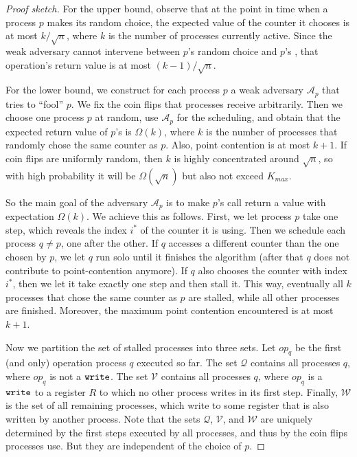 \documentclass[11pt,letterpaper]{article}
\newcommand{\xwrite}{\text{\tt write}\xspace}
\renewcommand{\AA}{\mathcal{A}}
\newcommand{\QQ}{\mathcal{Q}}
\newcommand{\VV}{\mathcal{V}}
\newcommand{\WW}{\mathcal{W}}
\newcommand{\op}{\ensuremath{\mathit{op}}}
\begin{document}
\begin{proof}[Proof sketch]
For the upper bound, observe that at the point in time when a process $p$ makes its random choice, the expected value of the counter it chooses is at most $k/\sqrt{n}$, where $k$ is the number of processes currently active.
Since the weak adversary cannot intervene between $p$'s random choice and $p$'s \FAI{}, that operation's return value is at most $(k-1)/\sqrt{n}$.

For the lower bound, we construct for each process $p$ a weak adversary $\AA_p$ that tries to ``fool'' $p$.
We fix the coin flips that processes receive arbitrarily.
Then we choose one process $p$ at random, use $\AA_p$ for the scheduling, and obtain that the expected return value of $p$'s \FAI{} is $\Omega(k)$, where $k$ is the number of processes that randomly chose the same counter as $p$.
Also, point contention is at most $k+1$.
If coin flips are uniformly random, then $k$ is highly concentrated around $\sqrt{n}$, so with high probability it will be $\Omega(\sqrt{n})$ but also not exceed $K_{max}$.

So the main goal of the adversary $\AA_p$ is to make $p$'s \FAI{} call return a value with expectation $\Omega(k)$.
We achieve this as follows.
First, we let process $p$ take one step, which reveals the index $i^\ast$ of the counter it is using.
Then we schedule each process $q\neq p$, one after the other.
If $q$ accesses a different counter than the one chosen by $p$, we let $q$ run solo until it finishes the algorithm (after that $q$ does not contribute to point-contention anymore).
If $q$ also chooses the counter with index $i^\ast$, then we let it take exactly one step and then stall it.
This way, eventually all $k$ processes that chose the same counter as $p$ are stalled, while all other processes are finished.
Moreover, the maximum point contention encountered is at most $k+1$.

Now we partition the set of stalled processes into three sets.
Let $\op_q$ be the first (and only) operation process $q$ executed so far.
The set $\QQ$ contains all processes $q$, where $\op_q$ is not a $\xwrite$.
The set $\VV$ contains all processes $q$, where $\op_q$ is a $\xwrite$ to a register $R$ to which no other process writes in its first step.
Finally, $\WW$ is the set of all remaining processes, which write to some register that is also written by another process.
Note that the sets $\QQ$, $\VV$, and $\WW$ are uniquely determined by the first steps executed by all processes, and thus by the coin flips processes use.
But they are independent of the choice of $p$.


\end{proof}
\end{document}
